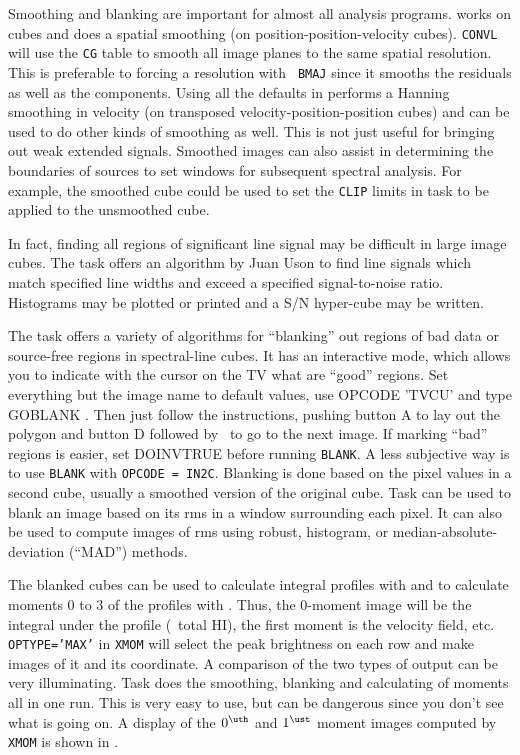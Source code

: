     Smoothing and blanking are important for almost all analysis
programs.  {\tt {}} works on cubes and does a spatial
smoothing (on position-position-velocity cubes).  {\tt CONVL} will use
the {\tt CG} table to smooth all image planes to the same spatial
resolution.  This is preferable to forcing a resolution with {\tt
BMAJ} since it smooths the residuals as well as the components.  Using
all the defaults in {\tt {}} performs a Hanning smoothing in
velocity (on transposed velocity-position-position cubes) and can be
used to do other kinds of smoothing as well.  This is not just useful
for bringing out weak extended signals.  Smoothed images can also
assist in determining the boundaries of sources to set windows for
subsequent spectral analysis. For example, the smoothed cube could be
used to set the {\tt CLIP} limits in task {\tt {}} to be
applied to the unsmoothed cube.

     In fact, finding all regions of significant line signal may be
difficult in large image cubes.  The task {\tt {}} offers an
algorithm by Juan Uson to find line signals which match specified line
widths and exceed a specified signal-to-noise ratio.  Histograms may
be plotted or printed and a S/N hyper-cube may be written.

    The task {\tt {}} offers a variety of algorithms for
``blanking'' out regions of bad data or source-free regions in
spectral-line cubes.  It has an interactive mode, which allows you to
indicate with the cursor on the TV what are ``good'' regions.  Set
everything but the image name to default values, use {\us OPCODE\qs
'TVCU' \CR} and type {\us GO\qs BLANK \CR}\@.  Then just follow the
instructions, pushing button A to lay out the polygon and button D
followed by \CR\ to go to the next image.  If marking ``bad'' regions
is easier, set {\us DOINV\qs TRUE \CR} before running {\tt BLANK}\@.
A less subjective way is to use {\tt BLANK} with {\tt OPCODE =
IN2C}\@.  Blanking is done based on the pixel values in a second cube,
usually a smoothed version of the original cube.
  Task {\tt {}} can be used to blank an
image based on its rms in a window surrounding each pixel.  It can
also be used to compute images of rms using robust, histogram, or
median-absolute-deviation (``MAD'') methods.

    The blanked cubes can be used to calculate integral profiles with
{\tt {}} and to calculate moments 0 to 3 of the profiles
with {\tt {}}\@. Thus, the 0-moment image will be the
integral under the profile (\eg\ total HI), the first moment is the
velocity field, etc.  {\tt OPTYPE='MAX'} in {\tt XMOM} will select the
peak brightness on each row and make images of it and its coordinate.
A comparison of the two types of output can be very illuminating.
Task {\tt {}} does the smoothing, blanking and calculating
of moments all in one run.  This is very easy to use, but can be
dangerous since you don't see what is going on.  A display of the
$0^{\uth}$ and $1^{\ust}$ moment images computed by {\tt XMOM} is
shown in .

